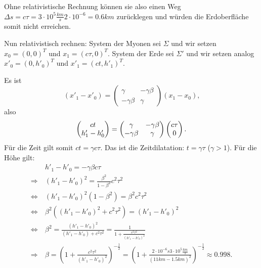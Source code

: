 Ohne relativistische Rechnung können sie also einen Weg $\Delta s = c \tau = 3 \cdot 10^5 \si{\frac{km}{s}} 2 \cdot 10^{-6} = 0.6 \si{km}$ zurücklegen und würden die Erdoberfläche somit nicht erreichen.

Nun relativistisch rechnen: System der Myonen sei $\Sigma$ und wir setzen $x_0 = (0, 0)^T$ und $x_1 = (c \tau, 0)^T$. System der Erde sei $\Sigma'$ und wir setzen analog $x'_0 = (0, h'_0)^T$ und $x'_1 = (ct, h'_1)^T$. 

Es ist
\[
	(x'_1 - x'_0) = \begin{pmatrix}
		\gamma & -\gamma \beta \\
		-\gamma \beta & \gamma
	\end{pmatrix}
	(x_1 - x_0)
	\text{,}
\]
also
\[
	\begin{pmatrix} ct \\ h'_1 - h'_0 \end{pmatrix} = \begin{pmatrix}
		\gamma & -\gamma \beta \\
		-\gamma \beta & \gamma
	\end{pmatrix}
	\begin{pmatrix} c \tau \\ 0 \end{pmatrix}
	\text{.}
\]
Für die Zeit gilt somit $ct = \gamma c \tau$. Das ist die Zeitdilatation: $t = \gamma \tau$ ($\gamma > 1$). Für die Höhe gilt:
\begin{align*}
	&~ h'_1 - h'_0 = - \gamma \beta c \tau \\
	\Longrightarrow &~ (h'_1 - h'_0)^2 = \frac{\beta^2}{1 - \beta^2} c^2 \tau^2 \\
	\Longleftrightarrow &~ (h'_1 - h'_0)^2 (1 - \beta^2) = \beta^2 c^2 \tau^2 \\
	\Longleftrightarrow &~ \beta^2 ((h'_1 - h'_0)^2 + c^2 \tau^2) = (h'_1 - h'_0)^2 \\
	\Longleftrightarrow &~ \beta^2 = \frac{(h'_1 - h'_0)^2}{(h'_1 - h'_0) + c^2 \tau^2} = \frac{1}{1 + \frac{c^2 \tau^2}{(h'_1 - h'_0)^2}} \\
	\Longrightarrow &~ \beta = \left( 1 + \frac{c^2 \tau^2}{(h'_1 - h'_0)^2} \right)^{- \frac{1}{2}}
	= \left( 1 + \frac{2 \cdot 10^{-6} s 3 \cdot 10^5 \si{\frac{km}{s}}}{(11 \si{km} - 1.5 \si{km})^2} \right)^{-\frac{1}{2}}
	\approx 0.998
	\text{.}
\end{align*}